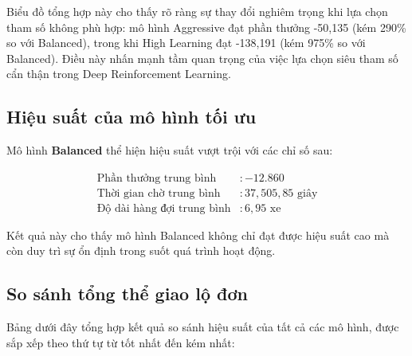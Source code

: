 Biểu đồ tổng hợp này cho thấy rõ ràng sự thay đổi nghiêm trọng khi lựa chọn tham số không phù hợp: mô hình Aggressive đạt phần thưởng -50,135 (kém 290\% so với Balanced), trong khi High Learning đạt -138,191 (kém 975\% so với Balanced). Điều này nhấn mạnh tầm quan trọng của việc lựa chọn siêu tham số cẩn thận trong Deep Reinforcement Learning.
\newpage
\subsection{Hiệu suất của mô hình tối ưu}

Mô hình \textbf{Balanced} thể hiện hiệu suất vượt trội với các chỉ số sau:

\begin{align}
    \text{Phần thưởng trung bình}     & : -12.860             \\
    \text{Thời gian chờ trung bình}   & : 37,505,85 \text{ giây} \\
    \text{Độ dài hàng đợi trung bình} & : 6,95 \text{ xe}
\end{align}

Kết quả này cho thấy mô hình Balanced không chỉ đạt được hiệu suất cao mà còn duy
trì sự ổn định trong suốt quá trình hoạt động.

\subsection{So sánh tổng thể giao lộ đơn}

Bảng dưới đây tổng hợp kết quả so sánh hiệu suất của tất cả các mô hình, được sắp
xếp theo thứ tự từ tốt nhất đến kém nhất:

